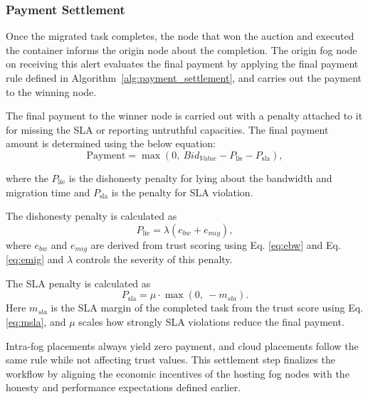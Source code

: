 \documentclass{article}
\begin{document}
\subsubsection{Payment Settlement}

Once the migrated task completes, the node that won the auction and executed the container informs the origin node about the completion. The origin fog node on receiving this alert evaluates the final payment by applying the final payment rule defined in Algorithm~\ref{alg:payment_settlement}, and carries out the payment to the winning node. 

The final payment to the winner node is carried out with a penalty attached to it for missing the SLA or reporting untruthful capacities. The final payment amount is determined using the below equation:
\begin{equation}
\text{Payment} = \max\left(0,\ Bid_{Value} - P_{\text{lie}} - P_{\text{sla}}\right),
\label{eq:payment}
\end{equation}

where the $P_{\text{lie}}$ is the dishonesty penalty for lying about the bandwidth and migration time and  $P_{\text{sla}}$ is the penalty for SLA violation.

The dishonesty penalty is calculated as
\begin{equation}
P_{\text{lie}} = \lambda \left(e_{bw} + e_{mig}\right),
\label{eq:plie}
\end{equation}
where $e_{bw}$ and $e_{mig}$ are derived from trust scoring using Eq. \ref{eq:ebw} and Eq. \ref{eq:emig} and $\lambda$ controls the severity of this penalty.

The SLA penalty is calculated as
\begin{equation}
P_{\text{sla}} = \mu \cdot \max\left(0,\ -m_{sla}\right).
\label{eq:psla}
\end{equation}
Here $m_{sla}$ is the SLA margin of the completed task from the trust score using Eq. \ref{eq:msla}, and $\mu$ scales how strongly SLA violations reduce the final payment.

Intra-fog placements always yield zero payment, and cloud placements follow the same rule while not affecting trust values. This settlement step finalizes the workflow by aligning the economic incentives of the hosting fog nodes with the honesty and performance expectations defined earlier.
\end{document}
